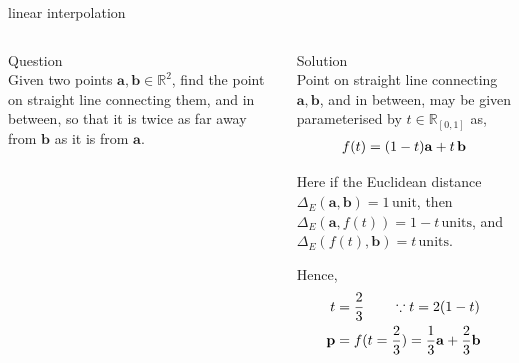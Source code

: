 \documentclass[aspectratio=169,xcolor={dvipsnames,svgnames}]{beamer}
\begin{document}
\begin{frame}[label={sec:orgafb95cd}]{linear interpolation}
\begin{columns}
\begin{column}{.3\columnwidth}
\alert{Question} \\[0pt]
Given two points \(\mathbf{a},\mathbf{b} \in
\mathbb{R}^2\), find the point on straight line
connecting them, and in between, so that it is twice as
far away from \(\mathbf{b}\) as it is from \(\mathbf{a}\).
\end{column}

\begin{column}{.7\columnwidth}
\alert{Solution} \\[0pt]
Point on straight line connecting
\(\mathbf{a},\mathbf{b}\), and in between, may be given
parameterised by \(t\in\mathbb{R}_{[0,1]}\) as,
\begin{align}
  \notag
  f(t) = (1-t)\mathbf{a} + t\,\mathbf{b}
\end{align}

Here if the Euclidean distance \(\Delta_E (\mathbf{a},
\mathbf{b}) = 1\,\mathrm{unit}\), then \(\Delta_E
(\mathbf{a}, f(t)) = 1-t\,\mathrm{units}\), and
\(\Delta_E (f(t), \mathbf{b}) = t\,\mathrm{units}\).

Hence,
\begin{align}
  \notag
  t &= \frac23 \qquad \because t = 2(1-t) \\
  \notag
  \mathbf{p} &= f(t=\frac23) =
               \frac13\mathbf{a} + \frac23\mathbf{b}
\end{align}
\end{column}
\end{columns}
\end{frame}
\end{document}
